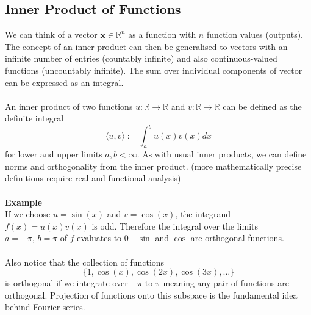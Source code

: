 \documentclass{report}
\begin{document}
\subsection{Inner Product of Functions}%
We can think of a vector $\bm{x}\in\mathbb{R}^n$ as a function with $n$ function values (outputs). The concept
of an inner product can then be generalised to vectors with an infinite number of entries (countably infinite) 
and also continuous-valued functions (uncountably infinite). The sum over individual components of vector
can be expressed as an integral.\\
\vspace{1mm}\\
An inner product of two functions $u:\mathbb{R}\to\mathbb{R}$ and $v:\mathbb{R}\to\mathbb{R}$ can be defined as
the definite integral
\begin{equation*}
\langle u,v\rangle:=\int_a^bu(x)v(x)dx
\end{equation*}
for lower and upper limits $a,b<\infty$. As with usual inner products, we can define norms and orthogonality
from the inner product. (more mathematically precise definitions require real and functional analysis)\\
\vspace{1mm}\\
\textbf{Example}\\
If we choose $u=\sin(x)$ and $v=\cos(x)$, the integrand $f(x)=u(x)v(x)$ is odd. Therefore the integral
over the limits $a=-\pi,\,b=\pi$ of $f$ evaluates to 0---$\sin$ and $\cos$ are orthogonal functions.\\
\vspace{1mm}\\
Also notice that the collection of functions
\begin{equation*}
\{1,\cos(x),\cos(2x),\cos(3x),\ldots\}
\end{equation*}
is orthogonal if we integrate over $-\pi$ to $\pi$ meaning any pair of functions are orthogonal. Projection
of functions onto this subspace is the fundamental idea
behind Fourier series.
\newpage
\end{document}

